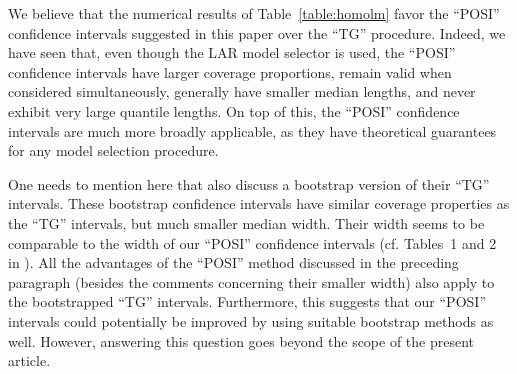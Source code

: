 \documentclass[preprint]{imsart}
\numberwithin{equation}{section}
\begin{document}
We believe that the numerical results of Table~\ref{table:homolm} favor the ``POSI'' confidence intervals suggested in this paper over the ``TG'' procedure. Indeed, we have seen that, even though the LAR model selector is used, the ``POSI'' confidence intervals have larger coverage proportions, remain valid when considered simultaneously, generally have smaller median lengths, and never exhibit very large quantile lengths. On top of this, the ``POSI'' confidence intervals are much more broadly applicable, as they have theoretical guarantees for any model selection procedure.


One needs to mention here that \cite{Tib15a} also discuss a bootstrap version of their ``TG'' intervals. These bootstrap confidence intervals have similar coverage properties as the ``TG'' intervals, but much smaller median width. Their width seems to be comparable to the width of our ``POSI'' confidence intervals (cf. Tables~1 and 2 in \cite{Tib15a}). All the advantages of the ``POSI'' method discussed in the preceding paragraph (besides the comments concerning their smaller width) also apply to the bootstrapped ``TG'' intervals. Furthermore, this suggests that our ``POSI'' intervals could potentially be improved by using suitable bootstrap methods as well. However, answering this question goes beyond the scope of the present article.
\end{document}
